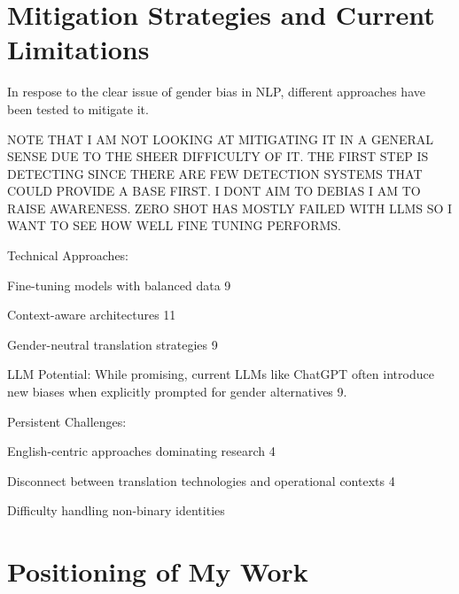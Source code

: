 \section{Mitigation Strategies and Current Limitations}    

In respose to the clear issue of gender bias in NLP, different approaches have been tested to mitigate it.

NOTE THAT I AM NOT LOOKING AT MITIGATING IT IN A GENERAL SENSE DUE TO THE SHEER DIFFICULTY OF IT. THE FIRST STEP IS DETECTING SINCE THERE ARE FEW DETECTION SYSTEMS THAT COULD PROVIDE A BASE FIRST. I DONT AIM TO DEBIAS I AM TO RAISE AWARENESS. ZERO SHOT HAS MOSTLY FAILED WITH LLMS SO I WANT TO SEE HOW WELL FINE TUNING PERFORMS.

Technical Approaches:

Fine-tuning models with balanced data 9

Context-aware architectures 11

Gender-neutral translation strategies 9

LLM Potential: While promising, current LLMs like ChatGPT often introduce new biases when explicitly prompted for gender alternatives 9.

Persistent Challenges:

English-centric approaches dominating research 4

Disconnect between translation technologies and operational contexts 4

Difficulty handling non-binary identities

\section{Positioning of My Work}    
    
